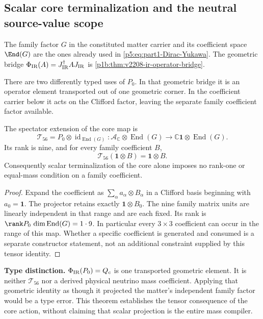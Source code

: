 \documentclass[12pt,a4paper]{article}
\begin{document}




\subsection{Scalar core terminalization and the neutral source-value scope}
\label{p5:sec:v2208-neutral-core-family}
The family factor $G$ in the constituted matter carrier and its coefficient
space $\End(G)$ are the ones already used in
\eqref{p5:eq:part1-Dirac-Yukawa}. The geometric bridge
$\Phi_{\rm IR}(A)=J_{\rm IR}^\dagger A J_{\rm IR}$ is
\ref{p1b:thm:v2208-ir-operator-bridge}.

There are two differently typed uses of $P_0$. In that geometric bridge it
is an operator element transported out of one geometric corner. In the
coefficient carrier below it acts on the Clifford factor, leaving the
separate family coefficient factor available.

\begin{theorem}
\label{p5:thm:v2208-terminal-tensor-extension}
The spectator extension of the core map is
\[
 \mathcal T_{56}=P_0\otimes\operatorname{id}_{\operatorname{End}(G)}:
 \mathcal A_{\mathbb C}\otimes\operatorname{End}(G)
 \longrightarrow\mathbb C\mathbf1\otimes\operatorname{End}(G).
\]
Its rank is nine, and for every family coefficient $B$,
\[
 \boxed{\mathcal T_{56}(\mathbf1\otimes B)=\mathbf1\otimes B.}
\]
Consequently scalar terminalization of the core alone imposes no rank-one
or equal-mass condition on a family coefficient.
\end{theorem}
\begin{proof}
Expand the coefficient as $\sum_\alpha a_\alpha\otimes B_\alpha$ in a
Clifford basis beginning with $a_0=\mathbf1$. The projector retains
exactly $\mathbf1\otimes B_0$. The nine family matrix units are linearly
independent in that range and are each fixed. Its rank is
$\rank P_0\,\dim\operatorname{End}(G)=1\cdot9$. In particular every
$3\times3$ coefficient can occur in the range of this map. Whether a
specific coefficient is generated and consumed is a separate constructor
statement, not an additional constraint supplied by this tensor identity.
\end{proof}
\noindent\textbf{Type distinction.}
$\Phi_{\rm IR}(P_0)=Q_c$ is one transported geometric element.
It is neither $\mathcal T_{56}$ nor a derived physical neutrino mass
coefficient. Applying that geometric identity as though it projected the
matter's independent family factor would be a type error. This theorem
establishes the tensor consequence of the core action, without claiming
that scalar projection is the entire mass compiler.
\end{document}
